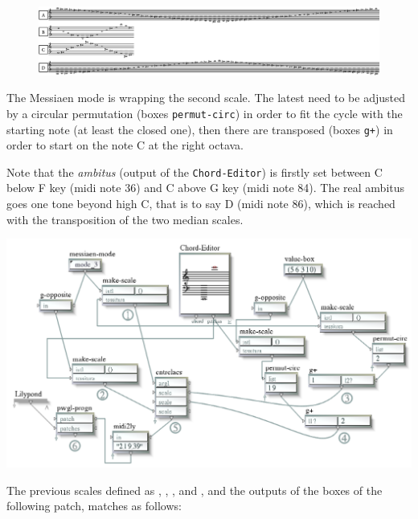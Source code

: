 \begin{figure}[htbp]
\begin{center}
\includegraphics[width=\textwidth]{mp/img/scale}
\end{center}
\end{figure}


The Messiaen mode is wrapping the second scale. The latest need to be adjusted by a circular permutation (boxes \texttt{permut-circ}) in order to fit the cycle with the starting note (at least the closed one), then there are transposed (boxes \texttt{g+}) in order to start on the note C at the right octava. 

Note that the \textit{ambitus} (output of the \texttt{Chord-Editor}) is firstly set between C below F key (midi note 36) and C above G key (midi note 84). The real ambitus goes one tone beyond high C, that is to say D (midi note 86), which is reached with the transposition of the two median scales.

{
\begin{center}
\includegraphics[width=\textwidth]{mp/img/patch}
\end{center}
} 

The previous scales defined as \textcolor{gray}{}, \textcolor{gray}{}, \textcolor{gray}{}, and \textcolor{gray}{}, and the outputs of the boxes of the following patch, matches as follows:

